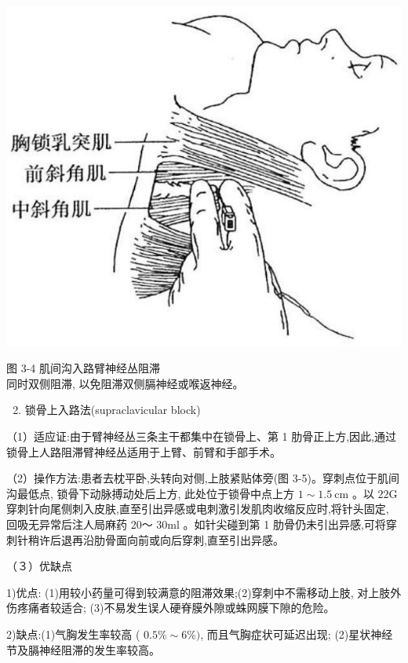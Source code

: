 \documentclass[10pt]{article}
\begin{document}
\begin{center}
\includegraphics[max width=\textwidth]{2024_07_09_002a177993bd97d1d6d7g-053(1)}
\end{center}

图 3-4 肌间沟入路臂神经丛阻滞\\
同时双侧阻滞, 以免阻滞双侧膈神经或喉返神经。

\begin{enumerate}
  \setcounter{enumi}{1}
  \item 锁骨上入路法(supraclavicular block)
\end{enumerate}

（1）适应证:由于臂神经丛三条主干都集中在锁骨上、第 1 肋骨正上方,因此,通过锁骨上人路阻滞臂神经丛适用于上臂、前臂和手部手术。

（2）操作方法:患者去枕平卧,头转向对侧,上肢紧贴体旁(图 3-5)。穿刺点位于肌间沟最低点, 锁骨下动脉搏动处后上方, 此处位于锁骨中点上方 $1 \sim 1.5 \mathrm{~cm}$ 。以 $22 \mathrm{G}$ 穿刺针向尾侧刺入皮肤,直至引出异感或电刺激引发肌肉收缩反应时,将针头固定, 回吸无异常后注人局麻药 20～ $30 \mathrm{ml}$ 。如针尖碰到第 1 肋骨仍未引出异感,可将穿刺针稍许后退再沿肋骨面向前或向后穿刺,直至引出异感。

（３）优缺点

1)优点: (1)用较小药量可得到较满意的阻滞效果;(2)穿刺中不需移动上肢, 对上肢外伤疼痛者较适合; (3)不易发生误人硬脊膜外隙或蛛网膜下隙的危险。

2)缺点:(1)气胸发生率较高 ( $0.5 \% \sim 6 \%)$, 而且气胸症状可延迟出现; (2)星状神经节及膈神经阻滞的发生率较高。
\end{document}

